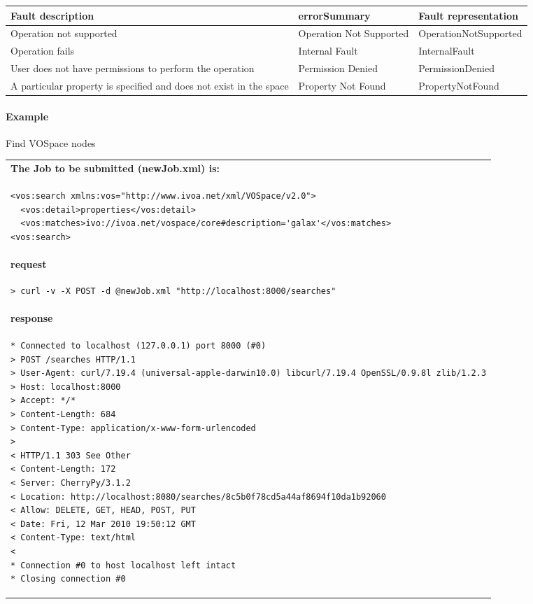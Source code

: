 \documentclass[11pt,a4paper]{ivoa}
\begin{document}
\vspace{3mm}
\begin{tabular}{ p{5cm} l p{4cm} }
\textbf{Fault description} & \textbf{errorSummary} & \textbf{Fault representation} \\
\hline
Operation not supported & Operation Not Supported & OperationNotSupported \\
\hline
Operation fails & Internal Fault & InternalFault \\
\hline
User does not have permissions to perform the operation	 & Permission Denied & PermissionDenied \\
\hline
A particular property is specified and does not exist in the space & Property Not Found & PropertyNotFound \\
\hline
\end{tabular}
\vspace{3mm}

\paragraph{Example}
Find VOSpace nodes

\begin{tabular}{ p{10cm} }
\\
\textbf{The Job to be submitted (newJob.xml) is:} \\
\begin{lstlisting}
<vos:search xmlns:vos="http://www.ivoa.net/xml/VOSpace/v2.0">
  <vos:detail>properties</vos:detail>
  <vos:matches>ivo://ivoa.net/vospace/core#description='galax'</vos:matches>
<vos:search>
\end{lstlisting} \\
\textbf{request} \\
\begin{lstlisting}
> curl -v -X POST -d @newJob.xml "http://localhost:8000/searches"
\end{lstlisting} \\
\textbf{response} \\
\begin{lstlisting}
* Connected to localhost (127.0.0.1) port 8000 (#0)
> POST /searches HTTP/1.1
> User-Agent: curl/7.19.4 (universal-apple-darwin10.0) libcurl/7.19.4 OpenSSL/0.9.8l zlib/1.2.3
> Host: localhost:8000
> Accept: */*
> Content-Length: 684
> Content-Type: application/x-www-form-urlencoded
> 
< HTTP/1.1 303 See Other
< Content-Length: 172
< Server: CherryPy/3.1.2
< Location: http://localhost:8080/searches/8c5b0f78cd5a44af8694f10da1b92060
< Allow: DELETE, GET, HEAD, POST, PUT
< Date: Fri, 12 Mar 2010 19:50:12 GMT
< Content-Type: text/html
< 
* Connection #0 to host localhost left intact
* Closing connection #0
\end{lstlisting} \\
\end{tabular}
\end{document}
